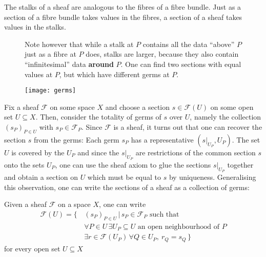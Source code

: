 The stalks of a sheaf are analogous to the fibres of a fibre bundle.
Just as a section of a fibre bundle takes values in the fibres, a section of
a sheaf takes values in the stalks.
\begin{lwarn}
  \begin{figure}[H]
    \begin{minipage}[t]{.5\textwidth}
      \vspace{0pt}
      Note however that while a stalk at $P$ contains all the data ``above''
      $P$ just as a fibre at $P$ does, stalks are larger, because they also
      contain ``infinitesimal'' data \textbf{around} $P$. One can find two
      sections with equal values at $P$, but which have different germs at
      $P$.
    \end{minipage}%
    \begin{minipage}[t]{.45\textwidth}
      \centering
      \vspace{0pt}
      \texttt{[image: germs]}
    \end{minipage}
  \end{figure}
\end{lwarn}
Fix a sheaf $\mathscr{F}$ on some space $X$ and choose a section
$s\in \mathscr{F}(U)$ on some open set $U\subseteq X$. Then, consider
the totality of germs of $s$ over $U$, namely the collection
$(s_{P})_{P\in U}$ with $s_{P}\in\mathscr{F}_{P}$. Since $\mathscr{F}$ is a
sheaf, it turns out that one can recover the section $s$ from the
germs: Each germ $s_{P}$ has a representative $(s\vert_{U_{P}}, U_{P})$.
The set $U$ is covered by the $U_{P}$ and since the $s\vert_{U_{P}}$ are
restrictions of the common section $s$ onto the sets $U_{P}$, one can use the
sheaf axiom to glue the sections $s\vert_{U_{P}}$ together and obtain a
section on $U$ which must be equal to $s$ by uniqueness. Generalising this
observation, one can write the sections of a sheaf as a collection of germs:
\begin{lemm}\label{lemm:sheafify_sheaf}
  Given a sheaf $\mathscr{F}$ on a space $X$, one can write
  \begin{align*}
    \mathscr{F}(U)=\big\{\,
    & (s_{P})_{P\in U}\,\big\vert\, s_{P}\in\mathscr{F}_{P}\text{ such that} \\
    & \forall P\in U\,
      \exists U_{P}\subseteq U\text{ an open neighbourhood of }P \\
    & \exists r\in\mathscr{F}(U_{P})\,\forall Q\in U_{P},\ r_{Q}=s_{Q}\,\big\}
  \end{align*}
  for every open set $U\subseteq X$
\end{lemm}
